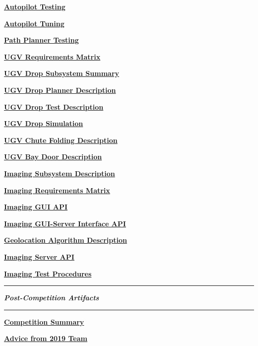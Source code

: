 \documentclass[]{article}
\newcounter{includepdfpage}
\newcommand{\pdflink}[2]{
\hyperlink{#1.1}{\textbf{#2}}
}
\newcommand{\pdflinkdoc}[2]{

}
\begin{document}
\pdflink{con_tes}{Autopilot Testing}

\pdflink{con_tun}{Autopilot Tuning}

\pdflink{pat_tes}{Path Planner Testing}

\pdflink{ugv_req}{UGV Requirements Matrix}

\pdflink{ugv_des}{UGV Drop Subsystem Summary}

\pdflink{ugv_drd}{UGV Drop Planner Description}

\pdflink{drp_tes}{UGV Drop Test Description}

\pdflink{drp_sim}{UGV Drop Simulation}

\pdflink{chu_fol}{UGV Chute Folding Description}

\pdflink{bay_des}{UGV Bay Door Description}

\pdflink{isd}{Imaging Subsystem Description}

\pdflink{irm}{Imaging Requirements Matrix}

\pdflink{iga}{Imaging GUI API}

\pdflink{igsia}{Imaging GUI-Server Interface API}

\pdflink{gad}{Geolocation Algorithm Description}

\pdflink{isa}{Imaging Server API}

\pdflink{itp}{Imaging Test Procedures}

\hrule

\textbf{\textit{Post-Competition Artifacts}}

\hrule

\pdflink{comp}{Competition Summary}
\pdflink{advice}{Advice from 2019 Team}


\pdflinkdoc{proj_cont}{./../ProjectContract/Capstone Team 45 Project Contract.pdf}
\pdflinkdoc{des_sum}{./PrimaryArtifacts/Design Summary/main.pdf}
\pdflinkdoc{des_des}{./PrimaryArtifacts/DesignDescription/DesignDescription.pdf}
\pdflinkdoc{sys_per}{./PrimaryArtifacts/Summary of System Performance/main.pdf}
\pdflinkdoc{req_mat}{./PrimaryArtifacts/SysRequirementsMatrix/requirements_matrix.pdf}
\end{document}
